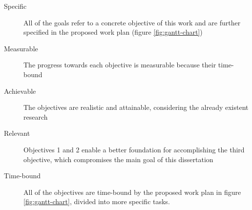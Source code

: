 \begin{description}
	\item[Specific] All of the goals refer to a concrete objective of this work and are further specified in the proposed work plan (figure \ref{fig:gantt-chart})
	\item[Measurable] The progress towards each objective is measurable because their time-bound
	\item[Achievable] The objectives are realistic and attainable, considering the already existent research
	\item[Relevant] Objectives 1 and 2 enable a better foundation for accomplishing the third objective, which compromises the main goal of this dissertation
	\item[Time-bound] All of the objectives are time-bound by the proposed work plan in figure \ref{fig:gantt-chart}, divided into more specific tasks.
\end{description}

